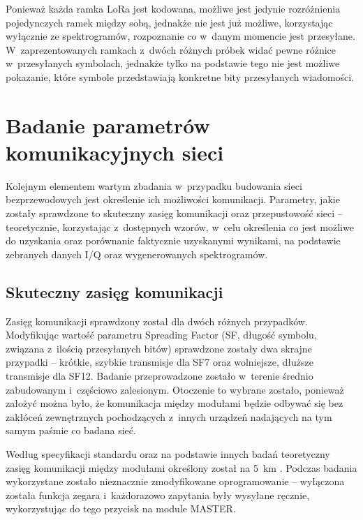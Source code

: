 Ponieważ każda ramka LoRa jest kodowana, możliwe jest jedynie rozróżnienia pojedynczych ramek między sobą, jednakże nie
jest już możliwe, korzystając wyłącznie ze spektrogramów, rozpoznanie co w~danym momencie jest przesyłane.
W~zaprezentowanych ramkach z~dwóch różnych próbek widać pewne różnice w~przesyłanych symbolach, jednakże tylko na
podstawie tego nie jest możliwe pokazanie, które symbole przedstawiają konkretne bity przesyłanych wiadomości.

\FloatBarrier

\section{\label{sect:network-communication-params}Badanie parametrów komunikacyjnych sieci} Kolejnym elementem wartym
zbadania w~przypadku budowania sieci bezprzewodowych jest określenie ich możliwości komunikacji. Parametry, jakie
zostały sprawdzone to skuteczny zasięg komunikacji oraz przepustowość sieci -- teoretycznie, korzystając z~dostępnych
wzorów, w~celu określenia co jest możliwe do uzyskania oraz porównanie faktycznie uzyskanymi wynikami, na podstawie
zebranych danych I/Q oraz wygenerowanych spektrogramów.

\subsection{\label{sect:network-communication-range}Skuteczny zasięg komunikacji} Zasięg komunikacji sprawdzony został
dla dwóch różnych przypadków. Modyfikując wartość parametru Spreading Factor (SF, długość symbolu, związana z~ilością
przesyłanych bitów) sprawdzone zostały dwa skrajne przypadki -- krótkie, szybkie transmisje dla SF7 oraz wolniejsze,
dłuższe transmisje dla SF12. Badanie przeprowadzone zostało w~terenie średnio zabudowanym i~częściowo zalesionym.
Otoczenie to wybrane zostało, ponieważ założyć można było, że komunikacja między modułami będzie odbywać się bez
zakłóceń zewnętrznych pochodzących z~innych urządzeń nadających na tym samym paśmie co badana sieć.

Według specyfikacji standardu oraz na podstawie innych badań teoretyczny zasięg komunikacji między modułami określony
został na 5~km \cite{lora-phy-range-test}. Podczas badania wykorzystane zostało nieznacznie zmodyfikowane oprogramowanie
-- wyłączona została funkcja zegara i~każdorazowo zapytania były wysyłane ręcznie, wykorzystując do tego przycisk na
module MASTER.

